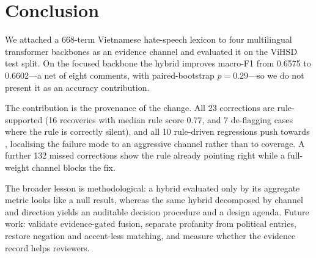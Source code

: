 \section{Conclusion}
\label{sec:conclusion}

We attached a 668-term Vietnamese hate-speech lexicon to four multilingual transformer
backbones as an evidence channel and evaluated it on the ViHSD test split. On the
focused backbone the hybrid improves macro-F1 from 0.6575 to 0.6602---a net of eight
comments, with paired-bootstrap $p=0.29$---so we do not present it as an accuracy
contribution.

The contribution is the provenance of the change. All 23 corrections are rule-supported
(16 \hate{} recoveries with median rule score 0.77, and 7 \clean{} de-flagging cases
where the rule is correctly silent), and all 10 rule-driven regressions push towards
\hate{}, localising the failure mode to an aggressive channel rather than to coverage.
A further 132 missed corrections show the rule already pointing right while a
full-weight \clean{} channel blocks the fix.

The broader lesson is methodological: a hybrid evaluated only by its aggregate metric
looks like a null result, whereas the same hybrid decomposed by channel and direction
yields an auditable decision procedure and a design agenda. Future work: validate
evidence-gated fusion, separate profanity from political entries, restore negation and
accent-less matching, and measure whether the evidence record helps reviewers.
